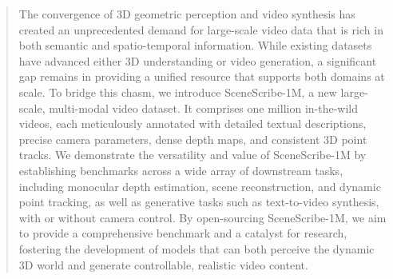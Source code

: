 \begin{abstract}
The convergence of 3D geometric perception and video synthesis has created an unprecedented demand for large-scale video data that is rich in both semantic and spatio-temporal information. While existing datasets have advanced either 3D understanding or video generation, a significant gap remains in providing a unified resource that supports both domains at scale. To bridge this chasm, we introduce SceneScribe-1M, a new large-scale, multi-modal video dataset. It comprises one million in-the-wild videos, each meticulously annotated with detailed textual descriptions, precise camera parameters, dense depth maps, and consistent 3D point tracks. We demonstrate the versatility and value of SceneScribe-1M by establishing benchmarks across a wide array of downstream tasks, including monocular depth estimation, scene reconstruction, and dynamic point tracking, as well as generative tasks such as text-to-video synthesis, with or without camera control. By open-sourcing SceneScribe-1M, we aim to provide a comprehensive benchmark and a catalyst for research, fostering the development of models that can both perceive the dynamic 3D world and generate controllable, realistic video content.
\end{abstract}